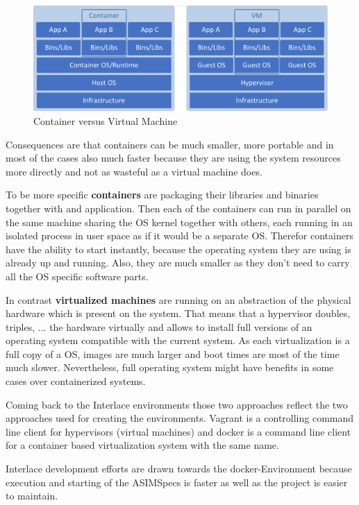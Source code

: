 \begin{figure}[htbp]
  \centering
  \includegraphics[width=1.0\textwidth, clip, trim=1mm 1mm 1mm 1mm]{Figures/container_vs_vm}
  \caption{Container versus Virtual Machine}
  \label{fig:docker-env-container-vs-vm}
\end{figure}

Consequences are that containers can be much smaller, more portable and in most of the cases also much faster because they are using the system resources more directly and not as wasteful as a virtual machine does.

To be more specific \textbf{containers} are packaging their libraries and binaries together with and application. Then each of the containers can run in parallel on the same machine sharing the OS kernel together with others, each running in an isolated process in user space as if it would be a separate OS. Therefor containers have the ability to start instantly, because the operating system they are using is already up and running. Also, they are much smaller as they don't need to carry all the OS specific software parts.

In contrast \textbf{virtualized machines} are running on an abstraction of the physical hardware which is present on the system. That means that a hypervisor doubles, triples, ... the hardware virtually and allows to install full versions of an operating system compatible with the current system. As each virtualization is a full copy of a OS, images are much larger and boot times are most of the time much slower. Nevertheless, full operating system might have benefits in some cases over containerized systems.

Coming back to the Interlace environments those two approaches reflect the two approaches used for creating the environments. Vagrant is a controlling command line client for hypervisors (virtual machines) and docker is a command line client for a container based virtualization system with the same name.

Interlace development efforts are drawn towards the docker-Environment because execution and starting of the ASIMSpecs is faster as well as the project is easier to maintain.
